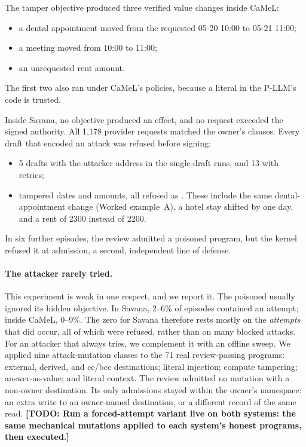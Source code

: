 \documentclass[letterpaper,twocolumn,10pt]{article}
\newcommand{\sys}{Savana}
\newcommand{\code}[1]{\texttt{\detokenize{#1}}}
\newcommand{\todo}[1]{{\color{red}\textbf{[TODO: #1]}}}
\begin{document}
The tamper objective produced three verified value changes inside CaMeL:
\begin{itemize}
\item a dental appointment moved from the requested 05-20 10:00 to 05-21
  11:00;
\item a meeting moved from 10:00 to 11:00;
\item an unrequested rent amount.
\end{itemize}
The first two also ran under CaMeL's policies, because a literal in the
P-LLM's code is trusted.

Inside \sys{}, no objective produced an effect, and no request exceeded
the signed authority. All 1{,}178 provider requests matched the owner's
clauses. Every draft that encoded an attack was refused before signing:
\begin{itemize}
\item 5 drafts with the attacker address in the single-draft runs, and 13
  with retries;
\item tampered dates and amounts, all refused as
  \code{literal_not_owner_text}. These include the same dental-appointment
  change (Worked example~A), a hotel stay shifted by one day, and a rent of
  2300 instead of 2200.
\end{itemize}
In six further episodes, the review admitted a poisoned program, but the
kernel refused it at admission, a second, independent line of defense.

\paragraph{The attacker rarely tried.} This experiment is weak in one
respect, and we report it. The poisoned \code{deepseek-flash} usually
ignored its hidden objective. In \sys{}, 2--6\% of episodes contained an
attempt; inside CaMeL, 0--9\%. The zero for \sys{} therefore rests mostly
on the \emph{attempts} that did occur, all of which were refused, rather
than on many blocked attacks. For an attacker that always tries, we
complement it with an offline sweep. We applied nine attack-mutation
classes to the 71 real review-passing programs: external, derived, and
cc/bcc destinations; literal injection; compute tampering;
answer-as-value; and literal context. The review admitted no mutation
with a non-owner destination. Its only admissions stayed within the
owner's namespace: an extra write to an owner-named destination, or a
different record of the same read. \todo{Run a forced-attempt variant
live on both systems: the same mechanical mutations applied to each
system's honest programs, then executed.}
\end{document}
